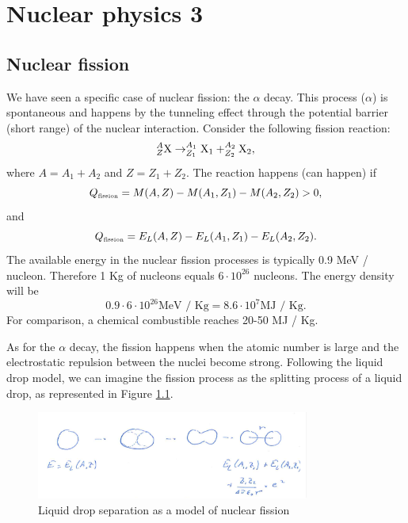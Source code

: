 \chapter{Nuclear physics 3}
\label{nuclear-physics-3}
\section{Nuclear fission}
We have seen a specific case of nuclear fission: the $\alpha$ decay. This process ($\alpha$) is spontaneous and happens by the tunneling effect through the potential barrier (short range) of the nuclear interaction. 
Consider the following fission reaction:
\begin{equation*}
    _{\tiny{Z}}^{\tiny{A}}\mbox{X} \rightarrow _{\tiny{Z}_1}^{\tiny{A}_1}\mbox{X}_1 + _{\tiny{Z}_2}^{\tiny{A}_2}\mbox{X}_2,
\end{equation*}
where $A = A_1 + A_2$ and $Z = Z_1 + Z_2$.
The reaction happens (can happen) if 
\begin{equation*}
    Q_{\tiny{\mbox{fission}}} = M(A,Z) - M(A_1,Z_1) - M(A_2,Z_2) > 0,
\end{equation*}
and 
\begin{equation*}
    Q_{\tiny{\mbox{fission}}} = E_{L}(A,Z) - E_{L}(A_1,Z_1) - E_{L}(A_2,Z_2).
\end{equation*}
The available energy in the nuclear fission processes is typically 0.9 MeV / nucleon. 
Therefore 1 Kg of nucleons equals $6\cdot 10 ^{26}$ nucleons. The energy density will be 
\begin{equation*}
    0.9 \cdot 6 \cdot 10^{26} \mbox{MeV / Kg} = 8.6 \cdot 10^7 \mbox{MJ / Kg}.
\end{equation*}
For comparison, a chemical combustible reaches 20-50 MJ / Kg.


As for the $\alpha$ decay, the fission happens when the atomic number is large and the electrostatic repulsion between the nuclei become strong. Following the liquid drop model, we can imagine the fission process as the splitting process of a liquid drop, as represented in Figure \ref{fig:nuclear-physics3-fig1}.
\begin{figure}
    \centering
    \includegraphics[width=0.8\textwidth]{Figures/nuclear-physics3-fig1}
    \caption{Liquid drop separation as a model of nuclear fission}
    \label{fig:nuclear-physics3-fig1}
\end{figure}

